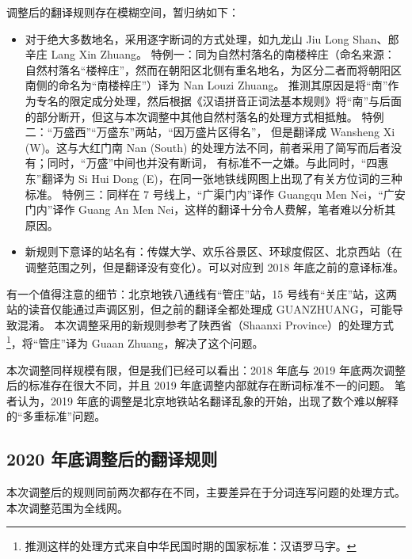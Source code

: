 \documentclass[a4paper,UTF8,12pt]{ctexart}
\begin{document}
        调整后的翻译规则存在模糊空间，暂归纳如下：
        \begin{itemize}
            \item 对于绝大多数地名，采用逐字断词的方式处理，如九龙山 Jiu Long Shan、郎辛庄 Lang Xin Zhuang。
                \subitem 特例一：同为自然村落名的南楼梓庄（命名来源：自然村落名“楼梓庄”，然而在朝阳区北侧有重名地名，为区分二者而将朝阳区南侧的命名为“南楼梓庄”）译为 Nan Louzi Zhuang。
                推测其原因是将“南”作为专名的限定成分处理，然后根据《汉语拼音正词法基本规则》将“南”与后面的部分断开，但这与本次调整中其他自然村落名的处理方式相抵触。
                \subitem 特例二：“万盛西”“万盛东”两站，“因万盛片区得名”，\cite{ref13} 但是翻译成 Wansheng Xi (W)。这与大红门南 Nan (South) 的处理方法不同，前者采用了简写而后者没有；同时，“万盛”中间也并没有断词，
                有标准不一之嫌。与此同时，“四惠东”翻译为 Si Hui Dong (E)，在同一张地铁线网图上出现了有关方位词的三种标准。
                \subitem 特例三：同样在 7 号线上，“广渠门内”译作 Guangqu Men Nei，“广安门内”译作 Guang An Men Nei，这样的翻译十分令人费解，笔者难以分析其原因。
            \item 新规则下意译的站名有：传媒大学、欢乐谷景区、环球度假区、北京西站（在调整范围之列，但是翻译没有变化）。可以对应到 2018 年底之前的意译标准。
        \end{itemize}

        有一个值得注意的细节：北京地铁八通线有“管庄”站，15 号线有“关庄”站，这两站的读音仅能通过声调区别，但之前的翻译全都处理成 GUANZHUANG，可能导致混淆。
        本次调整采用的新规则参考了陕西省（Shaanxi Province）的处理方式 \footnote{推测这样的处理方式来自中华民国时期的国家标准：汉语罗马字。}，将“管庄”译为 Guaan Zhuang，解决了这个问题。

        本次调整同样规模有限，但是我们已经可以看出：2018 年底与 2019 年底两次调整后的标准存在很大不同，并且 2019 年底调整内部就存在断词标准不一的问题。
        笔者认为，2019 年底的调整是北京地铁站名翻译乱象的开始，出现了数个难以解释的“多重标准”问题。
    \subsection{2020 年底调整后的翻译规则}
        本次调整后的规则同前两次都存在不同，主要差异在于分词连写问题的处理方式。本次调整范围为全线网。
\end{document}
